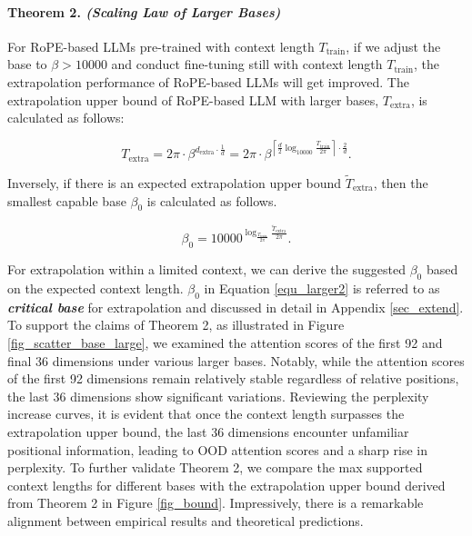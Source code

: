 \paragraph{Theorem 2. \textit{(Scaling Law of Larger Bases)} } For RoPE-based LLMs pre-trained with context length $T_\text{train}$, if we adjust the base to $\beta>10000$ and conduct fine-tuning still with context length $T_\text{train}$, the extrapolation performance of RoPE-based LLMs will get improved. The extrapolation upper bound of RoPE-based LLM with larger bases, $T_\text{extra}$, is calculated as follows:

\begin{equation}
    T_\text{extra}=2\pi\cdot\beta^{d_\text{extra}\cdot\frac{1}{d}}=2\pi\cdot\beta^{\left\lceil{\frac{d}{2}}\log_{10000}{\frac{T_\text{train}}{2\pi}}\right\rceil\cdot{\frac{2}{d}}}
\text{.}\label{equ_larger}\end{equation}

Inversely, if there is an expected extrapolation upper bound $\tilde{T}_\text{extra}$, then the smallest capable base $\beta_0$ is calculated as follows.

\begin{equation}
    \beta_0={10000}^{\log_{\frac{T_\text{train}}{2\pi}}{\frac{\tilde{T}_\text{extra}}{2\pi}}}
\text{.}\label{equ_larger2}\end{equation}

For extrapolation within a limited context, we can derive the suggested $\beta_0$ based on the expected context length. $\beta_0$ in Equation \ref{equ_larger2} is referred to as \textbf{\textit{critical base}} for extrapolation and discussed in detail in Appendix \ref{sec_extend}. To support the claims of Theorem 2, as illustrated in Figure \ref{fig_scatter_base_large}, we examined the attention scores of the first 92 and final 36 dimensions under various larger bases. Notably, while the attention scores of the first 92 dimensions remain relatively stable regardless of relative positions, the last 36 dimensions show significant variations. Reviewing the perplexity increase curves, it is evident that once the context length surpasses the extrapolation upper bound, the last 36 dimensions encounter unfamiliar positional information, leading to OOD attention scores and a sharp rise in perplexity. To further validate Theorem 2, we compare the max supported context lengths for different bases with the extrapolation upper bound derived from Theorem 2 in Figure \ref{fig_bound}. Impressively, there is a remarkable alignment between empirical results and theoretical predictions.

